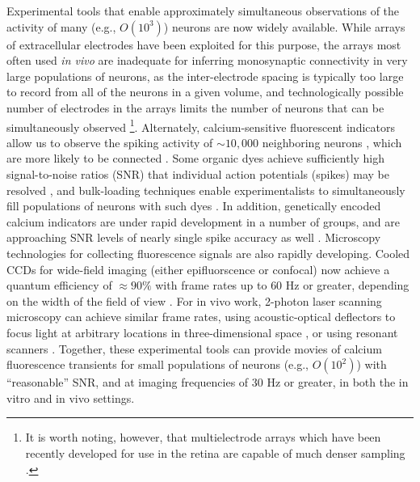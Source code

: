 Experimental tools that enable approximately simultaneous observations of the activity of many (e.g., $O(10^3)$) neurons are now widely available. While arrays of extracellular electrodes have been exploited for this purpose, the arrays most often used \emph{in vivo} are inadequate for inferring monosynaptic connectivity in very large populations of neurons, as the inter-electrode spacing is typically too large to record from all of the neurons in a given volume, and technologically possible number of electrodes in the arrays limits the number of neurons that can be simultaneously observed \cite{HATS98,HARR03,Stein04,Santhanam06,Harris07}\footnote{It is worth noting, however, that multielectrode arrays which have been recently developed for use in the retina are capable of much denser sampling \cite{Berry2004,Litke2004,Petrusca07,PILL07}.}. Alternately, calcium-sensitive fluorescent indicators allow us to observe the spiking activity of $\sim 10,000$ neighboring neurons \cite{Tsien89}, which are more likely to be connected \cite{Abeles91,Braitenberg1998}. Some organic dyes achieve sufficiently high signal-to-noise ratios (SNR) that individual action potentials (spikes) may be resolved \cite{ImagingManual}, and bulk-loading techniques enable experimentalists to simultaneously fill populations of neurons with such dyes \cite{StosiekKonnerth03}. In addition, genetically encoded calcium indicators are under rapid development in a number of groups, and are approaching SNR levels of nearly single spike accuracy as well \cite{WallaceHasan08}. Microscopy technologies for collecting fluorescence signals are also rapidly developing. Cooled CCDs for wide-field imaging (either epifluorscence or confocal) now achieve a quantum efficiency of $\approx 90 \%$ with frame rates up to $60$ Hz or greater, depending on the width of the field of view \cite{Djurisic04}. For in vivo work, 2-photon laser scanning microscopy can achieve similar frame rates, using acoustic-optical deflectors to focus light at arbitrary locations in three-dimensional space \cite{ReddySaggau05,Iyer06,SalomeBourdieu06,ReddySaggau08}, or using resonant scanners \cite{NguyenParker01}. Together, these experimental tools can provide movies of calcium fluorescence transients for small populations of neurons (e.g., $O(10^2)$) with ``reasonable'' SNR, and at imaging frequencies of 30 Hz or greater, in both the in vitro and in vivo settings.

